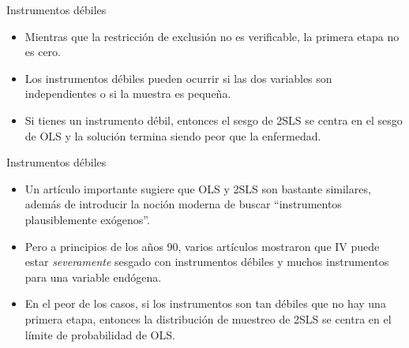 \documentclass{beamer}
\begin{document}
\begin{frame}{Instrumentos débiles}

\begin{itemize}
\item Mientras que la restricción de exclusión no es verificable, la primera etapa no es cero.
\item Los instrumentos débiles pueden ocurrir si las dos variables son independientes o si la muestra es pequeña.
\item Si tienes un instrumento débil, entonces el sesgo de 2SLS se centra en el sesgo de OLS y la solución termina siendo peor que la enfermedad.
\end{itemize}

\end{frame}

\begin{frame}{Instrumentos débiles}
	
	\begin{itemize}
	\item Un artículo importante sugiere que OLS y 2SLS son bastante similares, además de introducir la noción moderna de buscar ``instrumentos plausiblemente exógenos''.
	\item Pero a principios de los años 90, varios artículos mostraron que IV puede estar \emph{severamente} sesgado con instrumentos débiles y muchos instrumentos para una variable endógena.
	\item En el peor de los casos, si los instrumentos son tan débiles que no hay una primera etapa, entonces la distribución de muestreo de 2SLS se centra en el límite de probabilidad de OLS.
	\end{itemize}
\end{frame}




\end{document}
